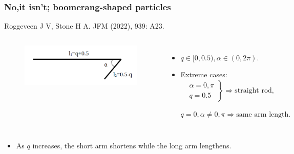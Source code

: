 \documentclass{beamer}
\newcommand{\bi}{\begin{itemize}}
\newcommand{\ei}{\end{itemize}}
\begin{document}
\begin{frame}
	\frametitle{No,it isn't; boomerang-shaped particles}
	\begin{overlayarea}{\textwidth}{\textheight}
		\vspace{-0.5cm}
		\footnotesize Roggeveen J V, Stone H A. JFM (2022), 939: A23.\vspace{-0.2cm}
		\begin{columns}
			\begin{figure}[htb]
				\begin{center}
					\includegraphics[width=1\textwidth]{plots/geometry2.png}
				\end{center}
			\end{figure}
			\small
			\bi
			\item $q \in [0,0.5), \alpha \in (0,2\pi)$.
			\item Extreme cases:
			$
			\label{eqn:1}
			\left.
			\begin{aligned}
				&\alpha=0,\pi \\
				&	q=0.5
			\end{aligned}
			\right\}\Longrightarrow \text{straight rod},$ 
			
			$q=0, \alpha \neq 0, \pi \Longrightarrow \text{same arm length}.
			$
			\ei 
		\end{columns}
		\vspace{0.1cm} \small
		\bi
		\item As $q$ increases, the short arm shortens while the long arm lengthens.
		\ei 
	\end{overlayarea}
\end{frame}

\end{document}
